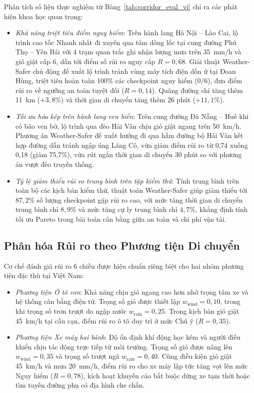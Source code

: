 Phân tích số liệu thực nghiệm từ Bảng~\ref{tab:corridor_eval_vi} chỉ ra các phát hiện khoa học quan trọng:
\begin{itemize}
    \item[-] \textit{Khả năng triệt tiêu điểm nguy hiểm}: Trên hành lang Hà Nội -- Lào Cai, lộ trình cao tốc Nhanh nhất đi xuyên qua tâm dông lốc tại cung đường Phú Thọ -- Yên Bái với 4 trạm quan trắc ghi nhận lượng mưa trên 35~mm/h và gió giật cấp 6, dẫn tới điểm số rủi ro nguy cấp $R = 0,68$. Giải thuật Weather-Safer chủ động đề xuất lộ trình tránh vùng mây tích điện dồn ứ tại Đoan Hùng, triệt tiêu hoàn toàn 100\% các checkpoint nguy hiểm ($0/6$), đưa điểm rủi ro về ngưỡng an toàn tuyệt đối ($R = 0,14$). Quãng đường chỉ tăng thêm 11~km ($+3,8\%$) và thời gian di chuyển tăng thêm 26 phút ($+11,1\%$).
    \item[-] \textit{Tối ưu hóa kép trên hành lang ven biển}: Trên cung đường Đà Nẵng -- Huế khi có bão ven bờ, lộ trình qua đèo Hải Vân chịu gió giật ngang trên 50~km/h. Phương án Weather-Safer đề xuất hướng đi qua hầm đường bộ Hải Vân kết hợp đường dẫn tránh ngập úng Lăng Cô, vừa giảm điểm rủi ro từ 0,74 xuống 0,18 (giảm 75,7\%), vừa rút ngắn thời gian di chuyển 30 phút so với phương án vượt đèo truyền thống.
    \item[-] \textit{Tỷ lệ giảm thiểu rủi ro trung bình trên tập kiểm thử}: Tính trung bình trên toàn bộ các kịch bản kiểm thử, thuật toán Weather-Safer giúp giảm thiểu tới $87,2\%$ số lượng checkpoint gặp rủi ro cao, với mức tăng thời gian di chuyển trung bình chỉ $8,9\%$ và mức tăng cự ly trung bình chỉ $4,7\%$, khẳng định tính tối ưu Pareto trong bài toán cân bằng giữa an toàn và chi phí vận tải.
\end{itemize}

\subsection{Phân hóa Rủi ro theo Phương tiện Di chuyển}
Cơ chế đánh giá rủi ro 6 chiều được hiệu chuẩn riêng biệt cho hai nhóm phương tiện đặc thù tại Việt Nam:
\begin{itemize}
    \item[-] \textit{Phương tiện Ô tô con}: Khả năng chịu gió ngang cao hơn nhờ trọng tâm xe và hệ thống cân bằng điện tử. Trọng số gió được thiết lập $w_{\text{wind}} = 0,10$, trong khi trọng số trơn trượt do ngập nước $w_{\text{rain}} = 0,25$. Trong kịch bản gió giật 45~km/h tại cầu cạn, điểm rủi ro ô tô duy trì ở mức Chú ý ($R = 0,35$).
    \item[-] \textit{Phương tiện Xe máy hai bánh}: Độ ổn định khí động học kém và người điều khiển chịu tác động trực tiếp từ môi trường. Trọng số gió được nâng lên $w_{\text{wind}} = 0,35$ và trọng số trượt ngã $w_{\text{rain}} = 0,40$. Cùng điều kiện gió giật 45~km/h và mưa 20~mm/h, điểm rủi ro cho xe máy lập tức tăng vọt lên mức Nguy hiểm ($R = 0,78$), kích hoạt khuyến cáo bắt buộc dừng xe tạm thời hoặc tìm tuyến đường phụ có địa hình che chắn.
\end{itemize}

